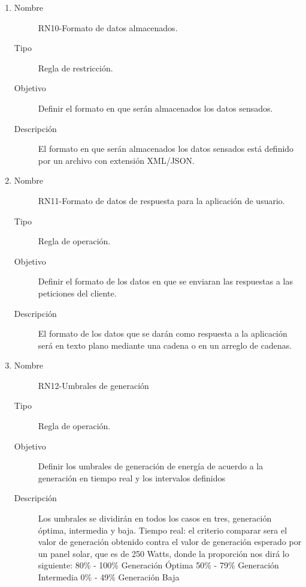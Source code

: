 \begin{enumerate}[label=RN\arabic*.]

\item \label{RN10}
		\begin{description}
			\item[Nombre] RN10-Formato de datos almacenados.
			\item[Tipo] Regla de restricción.
			\item[Objetivo] Definir el formato en que serán almacenados los datos sensados.
			\item[Descripción] El formato en que serán almacenados los datos sensados está definido por un archivo con extensión XML/JSON. 
		\end{description}
		
\item \label{RN11}
		\begin{description}
			\item[Nombre] RN11-Formato de datos de respuesta para la aplicación de usuario.
			\item[Tipo] Regla de operación.
			\item[Objetivo] Definir el formato de los datos en que se enviaran las respuestas a las peticiones del cliente.
			\item[Descripción] El formato de los datos que se darán como respuesta a la aplicación será en texto plano mediante una cadena o en un arreglo de cadenas.
		\end{description}
		
\item \label{RN12}
		\begin{description}
			\item[Nombre] RN12-Umbrales de generación
			\item[Tipo] Regla de operación.
			\item[Objetivo] Definir los umbrales de generación de energía de acuerdo a la generación en tiempo real y los intervalos definidos 
			\item[Descripción] Los umbrales se dividirán en todos los casos en tres, generación óptima, intermedia y baja.
			Tiempo real: el criterio comparar sera el valor de generación obtenido contra el valor de generación esperado por un panel solar, que es de 250 Watts, donde la proporción nos dirá lo siguiente:
			80\% - 100\% Generación Óptima
			50\% - 79\% Generación Intermedia
			0\% - 49\% Generación Baja
		\end{description}
		


\end{enumerate}